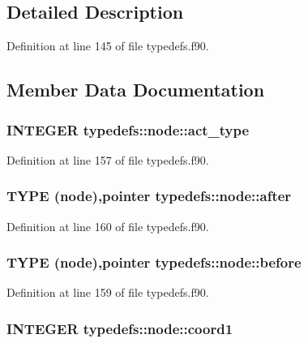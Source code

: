 \subsection{Detailed Description}


Definition at line 145 of file typedefs.f90.

\subsection{Member Data Documentation}
\hypertarget{typetypedefs_1_1node_ad6a59cc225341281c77e7ffa799a34de}{
\subsubsection[{act\_\-type}]{\setlength{\rightskip}{0pt plus 5cm}INTEGER {\bf typedefs::node::act\_\-type}}}
\label{typetypedefs_1_1node_ad6a59cc225341281c77e7ffa799a34de}


Definition at line 157 of file typedefs.f90.\hypertarget{typetypedefs_1_1node_a4bf4e05f8980654446c5f244ba9efbae}{
\subsubsection[{after}]{\setlength{\rightskip}{0pt plus 5cm}TYPE ({\bf node}),pointer {\bf typedefs::node::after}}}
\label{typetypedefs_1_1node_a4bf4e05f8980654446c5f244ba9efbae}


Definition at line 160 of file typedefs.f90.\hypertarget{typetypedefs_1_1node_a3b5c424e056d9e539f9e03279620ae68}{
\subsubsection[{before}]{\setlength{\rightskip}{0pt plus 5cm}TYPE ({\bf node}),pointer {\bf typedefs::node::before}}}
\label{typetypedefs_1_1node_a3b5c424e056d9e539f9e03279620ae68}


Definition at line 159 of file typedefs.f90.\hypertarget{typetypedefs_1_1node_a3d362f7d7c1c7a3313e9da95b07ef2d9}{
\subsubsection[{coord1}]{\setlength{\rightskip}{0pt plus 5cm}INTEGER {\bf typedefs::node::coord1}}}
\label{typetypedefs_1_1node_a3d362f7d7c1c7a3313e9da95b07ef2d9}


